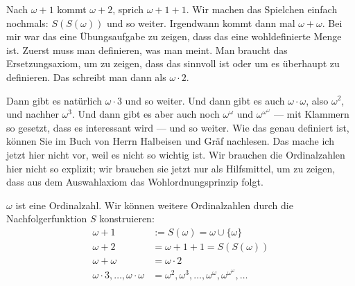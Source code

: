 \begin{spoken-clean}[00:34:45 - 00:36:15]
Nach $\omega + 1$ kommt $\omega + 2$, sprich $\omega + 1 + 1$. Wir machen das Spielchen einfach nochmals: $S(S(\omega))$ und so weiter. Irgendwann kommt dann mal $\omega + \omega$. Bei mir war das eine Übungsaufgabe zu zeigen, dass das eine wohldefinierte Menge ist. Zuerst muss man definieren, was man meint. Man braucht das Ersetzungsaxiom, um zu zeigen, dass das sinnvoll ist oder um es überhaupt zu definieren. Das schreibt man dann als $\omega \cdot 2$.

Dann gibt es natürlich $\omega \cdot 3$ und so weiter. Und dann gibt es auch $\omega \cdot \omega$, also $\omega^2$, und nachher $\omega^3$. Und dann gibt es aber auch noch $\omega^\omega$ und $\omega^{\omega^\omega}$ --- mit Klammern so gesetzt, dass es interessant wird --- und so weiter. Wie das genau definiert ist, können Sie im Buch von Herrn Halbeisen und Gräf nachlesen. Das mache ich jetzt hier nicht vor, weil es nicht so wichtig ist. Wir brauchen die Ordinalzahlen hier nicht so explizit; wir brauchen sie jetzt nur als Hilfsmittel, um zu zeigen, dass aus dem Auswahlaxiom das Wohlordnungsprinzip folgt.
\end{spoken-clean}

\begin{ai-global-state-checkpoint-invisible-content}
\end{ai-global-state-checkpoint-invisible-content}

\begin{math-stroke}
\begin{remark}
$\omega$ ist eine Ordinalzahl. Wir können weitere Ordinalzahlen durch die Nachfolgerfunktion $S$ konstruieren:
\begin{align*}
\omega + 1 &:= S(\omega) = \omega \cup \{\omega\} \\
\omega + 2 &= \omega + 1 + 1 = S(S(\omega)) \\
\omega + \omega &= \omega \cdot 2 \\
\omega \cdot 3, \dots, \omega \cdot \omega &= \omega^2, \omega^3, \dots, \omega^\omega, \omega^{\omega^\omega}, \dots
\end{align*}
\end{remark}
\end{math-stroke}

